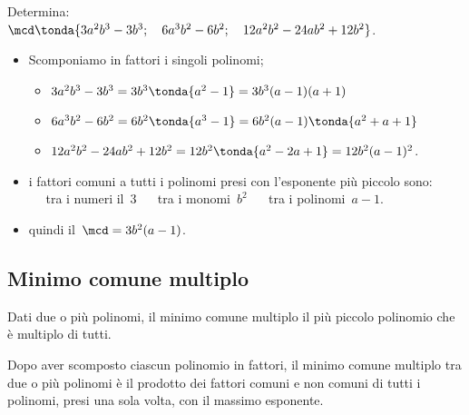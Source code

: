 \begin{esempio}{}{}
Determina:\\
\(\mcd \tonda{3a^{2}b^{3}-3b^{3};\quad 6a^{3}b^{2}-6b^{2}; 
            \quad 12a^{2}b^{2}-24ab^{2}+12b^{2}} \).
\begin{itemize}[nosep]
\item Scomponiamo in fattori i singoli polinomi;
\begin{itemize}[nosep]
\item \(3a^{2}b^{3}-3b^{3}=3b^{3} \tonda{a^{2}-1} =3b^{3}(a-1)(a+1)\)
\item \(6a^{3}b^{2}-6b^{2}=6b^{2} \tonda{a^{3}-1} =
        6b^{2}(a-1) \tonda{a^{2}+a+1} \)
\item \(12a^{2}b^{2}-24ab^{2}+12b^{2}=12b^{2} \tonda{a^{2}-2a+1} =
        12b^{2}(a-1)^{2}\).
\end{itemize}
\item i fattori comuni a tutti i polinomi presi con l'esponente più piccolo 
sono: \\
\textcolor{Salmon}{} ~~ tra i numeri il~\(3\) \hfill
\textcolor{Salmon}{} ~~ tra i monomi~\(b^{2}\) \hfill
\textcolor{Salmon}{} ~~ tra i polinomi~\(a-1\).
\item quindi il~\(\mcd=3b^{2}(a-1)\).
\end{itemize}
\end{esempio}

\subsection{Minimo comune multiplo}
Dati due o più polinomi, il minimo comune multiplo il più piccolo polinomio 
che è multiplo di tutti.

\begin{teorema}{}{}
Dopo aver scomposto ciascun polinomio in fattori, il minimo comune multiplo 
tra due o più polinomi è il prodotto dei fattori comuni e non comuni di tutti 
i polinomi, presi una sola volta, con il massimo esponente.
\end{teorema}

